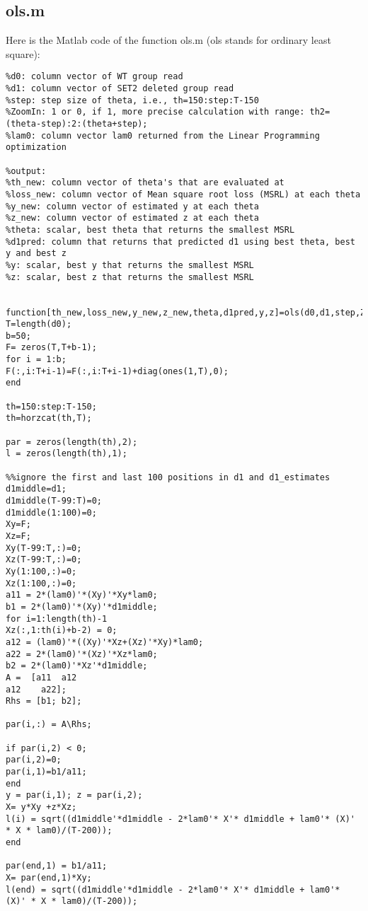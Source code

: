 \documentclass{article}
\begin{document}
\subsection{ols.m} \label{ols}

Here is the Matlab code of the function ols.m (ols stands for ordinary least square):

\begin{lstlisting}[frame=single]
%Input: 
%d0: column vector of WT group read
%d1: column vector of SET2 deleted group read
%step: step size of theta, i.e., th=150:step:T-150
%ZoomIn: 1 or 0, if 1, more precise calculation with range: th2= (theta-step):2:(theta+step);
%lam0: column vector lam0 returned from the Linear Programming optimization

%output:
%th_new: column vector of theta's that are evaluated at
%loss_new: column vector of Mean square root loss (MSRL) at each theta
%y_new: column vector of estimated y at each theta
%z_new: column vector of estimated z at each theta
%theta: scalar, best theta that returns the smallest MSRL
%d1pred: column that returns that predicted d1 using best theta, best y and best z
%y: scalar, best y that returns the smallest MSRL
%z: scalar, best z that returns the smallest MSRL


function[th_new,loss_new,y_new,z_new,theta,d1pred,y,z]=ols(d0,d1,step,ZoomIn,lam0)
T=length(d0);
b=50;
F= zeros(T,T+b-1);
for i = 1:b;
F(:,i:T+i-1)=F(:,i:T+i-1)+diag(ones(1,T),0);
end

th=150:step:T-150;
th=horzcat(th,T);

par = zeros(length(th),2);
l = zeros(length(th),1);

%%ignore the first and last 100 positions in d1 and d1_estimates
d1middle=d1;
d1middle(T-99:T)=0;
d1middle(1:100)=0;
Xy=F;
Xz=F;
Xy(T-99:T,:)=0;
Xz(T-99:T,:)=0;
Xy(1:100,:)=0;
Xz(1:100,:)=0;
a11 = 2*(lam0)'*(Xy)'*Xy*lam0;
b1 = 2*(lam0)'*(Xy)'*d1middle;
for i=1:length(th)-1
Xz(:,1:th(i)+b-2) = 0;
a12 = (lam0)'*((Xy)'*Xz+(Xz)'*Xy)*lam0;
a22 = 2*(lam0)'*(Xz)'*Xz*lam0;
b2 = 2*(lam0)'*Xz'*d1middle;
A =  [a11  a12
a12    a22];
Rhs = [b1; b2];

par(i,:) = A\Rhs;

if par(i,2) < 0;
par(i,2)=0;
par(i,1)=b1/a11;
end
y = par(i,1); z = par(i,2);
X= y*Xy +z*Xz;
l(i) = sqrt((d1middle'*d1middle - 2*lam0'* X'* d1middle + lam0'* (X)' * X * lam0)/(T-200)); 
end

par(end,1) = b1/a11;
X= par(end,1)*Xy;
l(end) = sqrt((d1middle'*d1middle - 2*lam0'* X'* d1middle + lam0'* (X)' * X * lam0)/(T-200)); 



\end{lstlisting}
\end{document}
